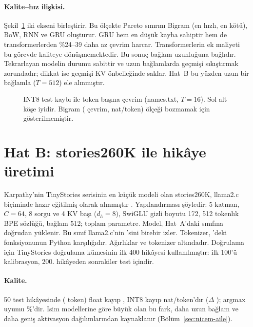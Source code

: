\paragraph{Kalite--hız ilişkisi.} Şekil~\ref{fig:zoo-pareto} iki ekseni birleştirir. Bu ölçekte Pareto sınırını Bigram (en hızlı, en kötü), BoW, RNN ve GRU oluşturur. GRU hem en düşük kayba sahiptir hem de transformerlerden \%24--39 daha az çevrim harcar. Transformerlerin ek maliyeti bu görevde kaliteye dönüşmemektedir. Bu sonuç bağlam uzunluğuna bağlıdır. Tekrarlayan modelin durumu sabittir ve uzun bağlamlarda geçmişi sıkıştırmak zorundadır; dikkat ise geçmişi KV önbelleğinde saklar. Hat~B bu yüzden uzun bir bağlamla ($T=512$) ele alınmıştır.

\begin{figure}[h]
  \centering
  \caption[Kalite ve hız]{INT8 test kaybı ile token başına çevrim (names.txt, $T=16$). Sol alt köşe iyidir. Bigram (\zooBigramCyc{} çevrim, \zooBigramInt{} nat/token) ölçeği bozmamak için gösterilmemiştir.}
  \label{fig:zoo-pareto}
\end{figure}

\section{Hat B: stories260K ile hikâye üretimi}\label{sec:hatB}

Karpathy'nin TinyStories serisinin en küçük modeli olan stories260K, llama2.c biçiminde hazır eğitilmiş olarak alınmıştır \cite{llama2c}. Yapılandırması şöyledir: 5 katman, $C=64$, 8 sorgu ve 4 KV başı ($d_h=8$), SwiGLU gizli boyutu 172, 512 tokenlık BPE sözlüğü, bağlam 512; toplam \zooStoriesParams{} parametre. Model, Hat~A'daki  sınıfına doğrudan yüklenir. Bu sınıf llama2.c'nin 'sini birebir izler. Tokenizer, 'deki  fonksiyonunun Python karşılığıdır. Ağırlıklar ve tokenizer  altındadır. Doğrulama için TinyStories doğrulama kümesinin ilk 400 hikâyesi kullanılmıştır: ilk 100'ü kalibrasyon, 200. hikâyeden sonrakiler test içindir.

\paragraph{Kalite.} 50 test hikâyesinde (\zooStoriesTokens{} token) float kayıp \zooStoriesFloat, INT8 kayıp \zooStoriesInt{} nat/token'dır ($\Delta$ \zooStoriesDelta); argmax uyumu \%\zooStoriesAgree'dir. Isim modellerine göre büyük olan bu fark, daha uzun bağlam ve daha geniş aktivasyon dağılımlarından kaynaklanır (Bölüm~\ref{sec:nicem-aile}).

